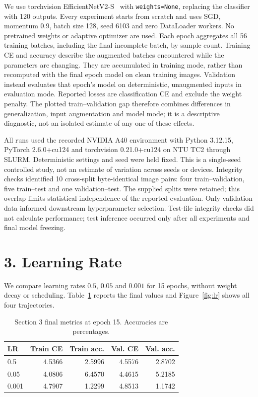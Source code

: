 \documentclass[letterpaper]{article}
\begin{document}
We use torchvision EfficientNetV2-S~\cite{tan2021efficientnetv2} with
\texttt{weights=None}, replacing the classifier with 120 outputs. Every experiment
starts from scratch and uses SGD, momentum 0.9, batch size 128, seed 6103 and
zero DataLoader workers. No pretrained weights or adaptive optimizer are used.
Each epoch aggregates all 56 training batches, including the final incomplete
batch, by sample count. Training CE and accuracy describe the augmented batches
encountered while the parameters are changing. They are accumulated in training
mode, rather than recomputed with the final epoch model on clean training images.
Validation instead evaluates that epoch's model on deterministic, unaugmented
inputs in evaluation mode. Reported losses are classification CE and exclude
the weight penalty. The plotted train--validation gap therefore combines
differences in generalization, input augmentation and model mode; it is a
descriptive diagnostic, not an isolated estimate of any one of these effects.

All runs used the recorded NVIDIA A40 environment with Python 3.12.15,
PyTorch 2.6.0+cu124 and torchvision 0.21.0+cu124 on NTU TC2 through SLURM.
Deterministic settings and seed were held fixed. This is a single-seed controlled
study, not an estimate of variation across seeds or devices. Integrity checks
identified 10 cross-split byte-identical image pairs: four train--validation,
five train--test and one validation--test. The supplied splits were retained;
this overlap limits statistical independence of the reported evaluation.
Only validation data informed downstream hyperparameter selection. Test-file
integrity checks did not calculate performance; test inference occurred only
after all experiments and final model freezing.



\section{3. Learning Rate}
We compare learning rates $0.5$, $0.05$ and $0.001$ for 15 epochs, without weight
decay or scheduling. Table~\ref{tab:lr} reports the final values and
Figure~\ref{fig:lr} shows all four trajectories.

\begin{table}[t]
\centering\small
\begin{tabular}{lrrrr}\toprule
LR & Train CE & Train acc. & Val. CE & Val. acc.\\\midrule
0.5 & 4.5366 & 2.5996 & 4.5576 & 2.8702 \\
0.05 & 4.0806 & 6.4570 & 4.4615 & 5.2185 \\
0.001 & 4.7907 & 1.2299 & 4.8513 & 1.1742 \\
\bottomrule\end{tabular}
\normalsize
\caption{Section 3 final metrics at epoch 15. Accuracies are percentages.}
\label{tab:lr}
\end{table}
\end{document}
